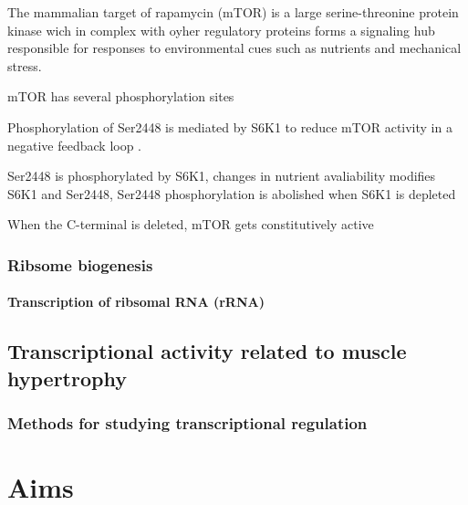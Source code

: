 \documentclass[twoside,10pt]{gihclass} %
\begin{document}
The mammalian target of rapamycin (mTOR) is a large serine-threonine protein kinase wich in complex with oyher regulatory proteins forms a signaling hub responsible for responses to environmental cues such as nutrients and mechanical stress.

mTOR has several phosphorylation sites

Phosphorylation of Ser2448 is mediated by S6K1 to reduce mTOR activity in a negative feedback loop .

Ser2448 is phosphorylated by S6K1, changes in nutrient avaliability modifies S6K1 and Ser2448, Ser2448 phosphorylation is abolished when S6K1 is depleted

When the C-terminal is deleted, mTOR gets constitutively active

\hypertarget{ribsome-biogenesis}{%
\subsection{Ribsome biogenesis}\label{ribsome-biogenesis}}

\hypertarget{transcription-of-ribsomal-rna-rrna}{%
\subsubsection{Transcription of ribsomal RNA (rRNA)}\label{transcription-of-ribsomal-rna-rrna}}

\hypertarget{transcriptional-activity-related-to-muscle-hypertrophy}{%
\section{Transcriptional activity related to muscle hypertrophy}\label{transcriptional-activity-related-to-muscle-hypertrophy}}

\hypertarget{methods-for-studying-transcriptional-regulation}{%
\subsection{Methods for studying transcriptional regulation}\label{methods-for-studying-transcriptional-regulation}}

\hypertarget{aims}{%
\chapter{Aims}\label{aims}}
\end{document}
